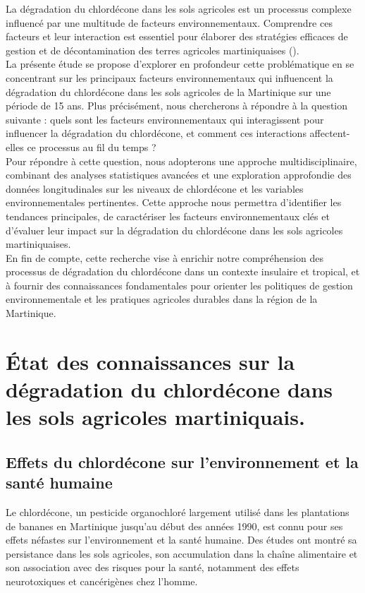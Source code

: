 \documentclass{report}
\begin{document}
La dégradation du chlordécone dans les sols agricoles est un processus complexe influencé par une multitude de facteurs environnementaux. Comprendre ces facteurs et leur interaction est essentiel pour élaborer des stratégies efficaces de gestion et de décontamination des terres agricoles martiniquaises (\cite{dromard2016assessment}).\\

La présente étude se propose d'explorer en profondeur cette problématique en se concentrant sur les principaux facteurs environnementaux qui influencent la dégradation du chlordécone dans les sols agricoles de la Martinique sur une période de 15 ans. Plus précisément, nous chercherons à répondre à la question suivante : quels sont les facteurs environnementaux qui interagissent pour influencer la dégradation du chlordécone, et comment ces interactions affectent-elles ce processus au fil du temps ?\\

Pour répondre à cette question, nous adopterons une approche multidisciplinaire, combinant des analyses statistiques avancées et une exploration approfondie des données longitudinales sur les niveaux de chlordécone et les variables environnementales pertinentes. Cette approche nous permettra d'identifier les tendances principales, de caractériser les facteurs environnementaux clés et d'évaluer leur impact sur la dégradation du chlordécone dans les sols agricoles martiniquaises.\\

En fin de compte, cette recherche vise à enrichir notre compréhension des processus de dégradation du chlordécone dans un contexte insulaire et tropical, et à fournir des connaissances fondamentales pour orienter les politiques de gestion environnementale et les pratiques agricoles durables dans la région de la Martinique.

\chapter*{État des connaissances sur la dégradation du chlordécone dans les sols agricoles martiniquais.}

\section*{Effets du chlordécone sur l'environnement et la santé humaine}
Le chlordécone, un pesticide organochloré largement utilisé dans les plantations de bananes en Martinique jusqu'au début des années 1990, est connu pour ses effets néfastes sur l'environnement et la santé humaine. Des études ont montré sa persistance dans les sols agricoles, son accumulation dans la chaîne alimentaire et son association avec des risques pour la santé, notamment des effets neurotoxiques et cancérigènes chez l'homme.\\
\end{document}
